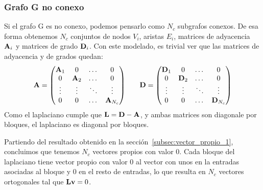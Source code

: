 \documentclass{article}
\begin{document}
\subsubsection{Grafo G no conexo}

Si el grafo G es no conexo, podemos pensarlo como $N_c$ subgrafos conexos. De esa forma
obtenemos $N_c$ conjuntos de nodos $V_i$, aristas $E_i$, matrices de adyacencia $\mathbf{A}_i$ y matrices de grado $\mathbf{D}_i$. Con este modelado, es trivial ver que las matrices de adyacencia y de grados quedan:
\begin{equation*}
    \begin{array}{l c r}
        \mathbf{A} = \left(\begin{matrix}
                             \mathbf{A}_1 & 0      & \dots  & 0          \\
                             0      & \mathbf{A}_2 & \dots  & 0          \\
                             \vdots & \vdots & \ddots & \vdots     \\
                             0      & 0      & \dots  & \mathbf{A}_{N_c}
                         \end{matrix}\right)
         &  &
        \mathbf{D} =\left(\begin{matrix}
                             \mathbf{D}_1 & 0       & \dots  & 0           \\
                             0       & \mathbf{D}_2 & \dots  & 0           \\
                             \vdots  & \vdots  & \ddots & \vdots      \\
                             0       & 0       & \dots  & \mathbf{D}_{N_c}
                         \end{matrix}\right)
    \end{array}
\end{equation*}
Como el laplaciano cumple que $\mathbf{L} = \mathbf{D} - \mathbf{A}$, y ambas matrices son diagonale por bloques, el laplaciano es diagonal por bloques.

Partiendo del resultado obtenido en la sección~\ref{subsec:vector_propio_1}, concluimos que tenemos $N_c$ vectores propios con valor 0. Cada bloque del laplaciano tiene vector propio con valor 0 al vector con unos en la entradas asociadas al bloque y 0 en el resto de entradas, lo que resulta en $N_c$ vectores ortogonales tal que $\mathbf{L} \mathbf{v} = 0$.
\end{document}
